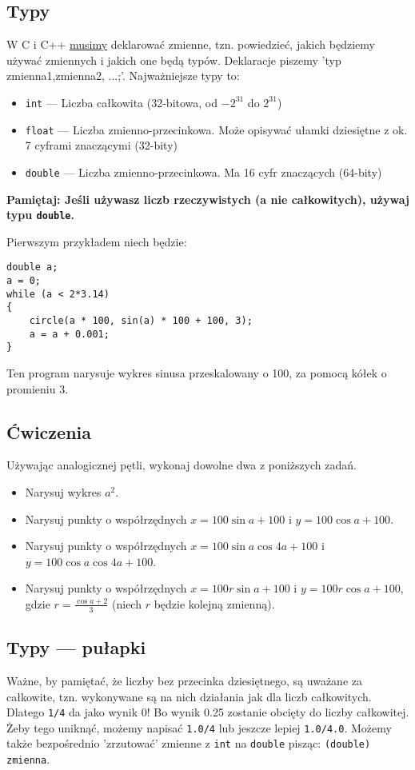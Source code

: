 \documentclass{instrukcja}
\begin{document}
\subsection{Typy}
W C i C++ \underline{musimy} deklarować zmienne, tzn. powiedzieć, jakich będziemy używać zmiennych i jakich one będą typów. Deklaracje piszemy 'typ zmienna1,zmienna2, ...;'. Najważniejsze typy to:
\begin{itemize}
\item {\tt int} --- Liczba całkowita (32-bitowa, od $-2^{31}$ do $2^{31}$)
\item {\tt float} --- Liczba zmienno-przecinkowa. Może opisywać ułamki dziesiętne z ok. 7 cyframi znaczącymi (32-bity)
\item {\tt double} --- Liczba zmienno-przecinkowa. Ma 16 cyfr znaczących (64-bity)
\end{itemize}

{\bf{\red Pamiętaj:} Jeśli używasz liczb rzeczywistych (a nie całkowitych), używaj typu {\tt double}.}

Pierwszym przykładem niech będzie:
\begin{verbatim}
double a;
a = 0;
while (a < 2*3.14)
{
    circle(a * 100, sin(a) * 100 + 100, 3);
    a = a + 0.001;
}
\end{verbatim}
Ten program narysuje wykres sinusa przeskalowany o 100, za pomocą kółek o promieniu 3.

\subsection*{Ćwiczenia}
Używając analogicznej pętli, wykonaj dowolne dwa z poniższych zadań.
\begin{itemize}
\item Narysuj wykres $a^2$.
\item Narysuj punkty o współrzędnych $x=100\sin{a}+100$ i $y=100\cos{a}+100$.
\item Narysuj punkty o współrzędnych $x=100\sin{a}\cos{4a}+100$ i $y=100\cos{a}\cos{4a}+100$.
\item Narysuj punkty o współrzędnych $x=100r\sin{a}+100$ i $y=100r\cos{a}+100$, gdzie $r = \frac{\cos{a}+2}{3}$ (niech $r$ będzie kolejną zmienną).
\end{itemize}

\subsection{Typy --- pułapki}
Ważne, by pamiętać, że liczby bez przecinka dziesiętnego, są uważane za całkowite, tzn. wykonywane są na nich działania jak dla liczb całkowitych. Dlatego {\tt 1/4} da jako wynik 0! Bo wynik 0.25 zostanie obcięty do liczby całkowitej. Żeby tego uniknąć, możemy napisać {\tt 1.0/4} lub jeszcze lepiej {\tt 1.0/4.0}. Możemy także bezpośrednio 'zrzutować' zmienne z {\tt int} na {\tt double} pisząc: {\tt (double) zmienna}.
\end{document}
